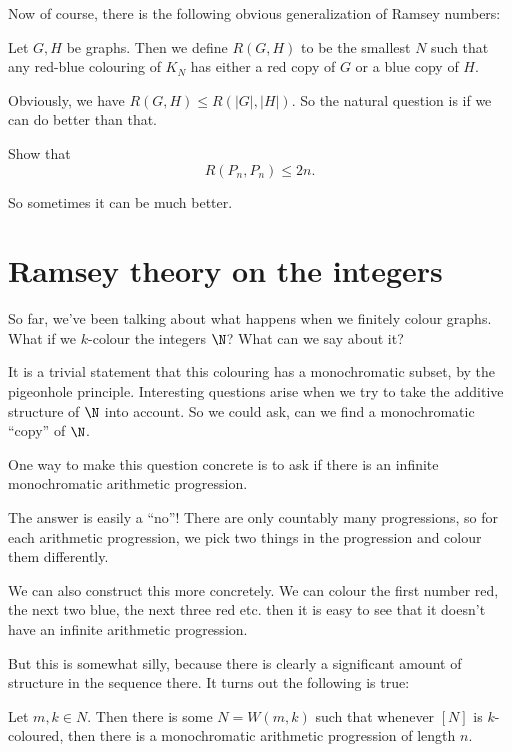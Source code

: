 \documentclass[a4paper]{article}
\begin{document}
Now of course, there is the following obvious generalization of Ramsey numbers:
\begin{defi}[$R(G, H)$]
  Let $G, H$ be graphs. Then we define $R(G, H)$ to be the smallest $N$ such that any red-blue colouring of $K_N$ has either a red copy of $G$ or a blue copy of $H$.
\end{defi}
Obviously, we have $R(G, H) \leq R(|G|, |H|)$. So the natural question is if we can do better than that.

\begin{ex}
  Show that
  \[
    R(P_n, P_n) \leq 2n.
  \]
\end{ex}
So sometimes it can be much better.

\section{Ramsey theory on the integers}
So far, we've been talking about what happens when we finitely colour graphs. What if we $k$-colour the integers $\N$? What can we say about it?

It is a trivial statement that this colouring has a monochromatic subset, by the pigeonhole principle. Interesting questions arise when we try to take the additive structure of $\N$ into account. So we could ask, can we find a monochromatic ``copy'' of $\N$.

One way to make this question concrete is to ask if there is an infinite monochromatic arithmetic progression.

The answer is easily a ``no''! There are only countably many progressions, so for each arithmetic progression, we pick two things in the progression and colour them differently.

We can also construct this more concretely. We can colour the first number red, the next two blue, the next three red etc. then it is easy to see that it doesn't have an infinite arithmetic progression.
\begin{center}
\end{center}
But this is somewhat silly, because there is clearly a significant amount of structure in the sequence there. It turns out the following is true:
\begin{thm}
  Let $m, k \in N$. Then there is some $N = W(m, k)$ such that whenever $[N]$ is $k$-coloured, then there is a monochromatic arithmetic progression of length $n$.
\end{thm}
\end{document}
